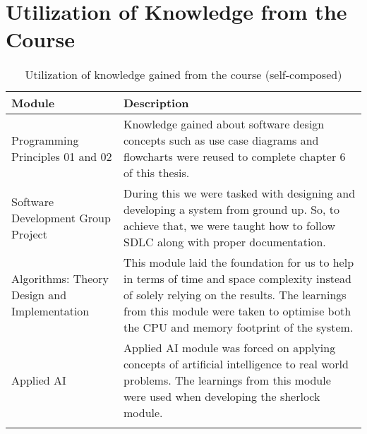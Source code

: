 \section{Utilization of Knowledge from the Course}


\begin{longtable}{|p{50mm}|p{105mm}|}
    \hline
    \textbf{Module} & 
    \textbf{Description} 
    \\ \hline

    Programming Principles 01 and 02 & 
    Knowledge gained about software design concepts such as use case diagrams and flowcharts were reused to complete chapter 6 of this thesis. 
    \\ \hline

    Software Development Group Project & 
    During this we were tasked with designing and developing a system from ground up. So, to achieve that, we were taught how to follow SDLC along with proper documentation. 
    \\ \hline

    Algorithms: Theory Design and Implementation & 
    This module laid the foundation for us to help in terms of time and space complexity instead of solely relying on the results. The learnings from this module were taken to optimise both the CPU and memory footprint of the system. 
    \\ \hline

    Applied AI & 
    Applied AI module was forced on applying concepts of artificial intelligence to real world problems. The learnings from this module were used when developing the \ac{sherlock} module. 
    \\ \hline    

    \caption{Utilization of knowledge gained from the course (self-composed)}
  \end{longtable}
  